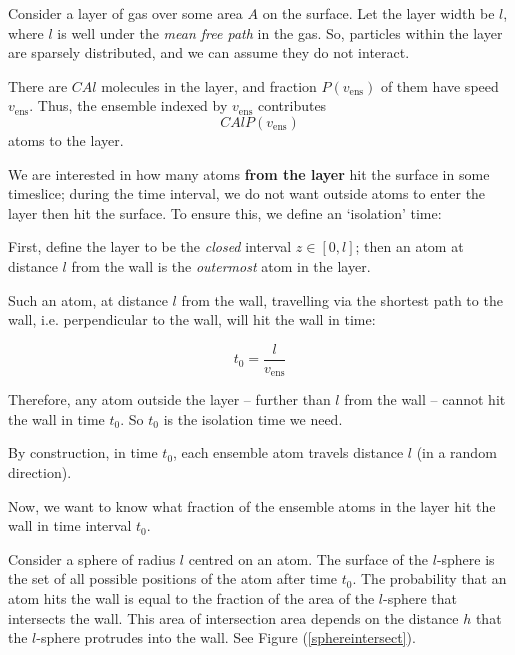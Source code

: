 \documentclass[12pt, a4paper, twoside, openright]{book}
\newcommand{\vens}{\ensuremath{v_{\mathrm{ens}}}}
\begin{document}
\vspace{1em}
Consider a layer of gas over some area $A$ on the surface. Let the layer width be $l$, where $l$ is well under the \emph{mean free path} in the gas. So, particles within the layer are sparsely distributed, and we can assume they do not interact.

There are $CAl$ molecules in the layer, and fraction $P(\vens)$ of them have speed $\vens$.
Thus, the ensemble indexed by $\vens$ contributes
\begin{equation}
C A l P(\vens)
\end{equation}
atoms to the layer.

\vspace{1em}
We are interested in how many atoms \textbf{from the layer} hit the surface in some timeslice; during the time interval, we do not want outside atoms to enter the layer then hit the surface. To ensure this, we define an `isolation' time:

First, define the layer to be the \emph{closed} interval $z \in [0,l]$; then an atom at distance $l$ from the wall is the \emph{outermost} atom in the layer.

Such an atom, at distance $l$ from the wall, travelling via the shortest path to the wall, i.e. perpendicular to the wall, will hit the wall in time:

\begin{equation}
t_0 = \frac{l}{\vens}
\end{equation}

Therefore, any atom outside the layer -- further than $l$ from the wall -- cannot hit the wall in time $t_0$.  So $t_0$ is the isolation time we need.

By construction, in time $t_0$, each ensemble atom travels distance $l$ (in a random direction).

\vspace*{1em}
Now, we want to know what fraction of the ensemble atoms in the layer hit the wall in time interval $t_0$.  

Consider a sphere of radius $l$ centred on an atom. The surface of the $l$-sphere is the set of all possible positions of the atom after time $t_0$.
The probability that an atom hits the wall is equal to the fraction of the area of the  $l$-sphere that intersects the wall. This area of intersection area depends on the distance $h$ that the $l$-sphere protrudes into the wall.  See Figure (\ref{sphereintersect}).

%
%
%
\end{document}
